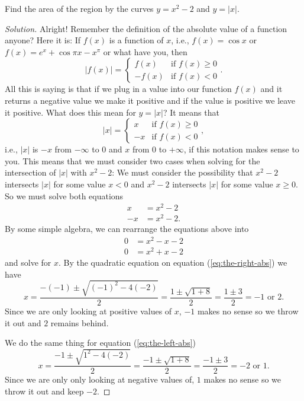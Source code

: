 \begin{problem}
Find the area of the region by the curves $y=x^2-2$ and $y=|x|$.
\end{problem}
\begin{proof}[Solution]
Alright! Remember the definition of the absolute value of a function
anyone? Here it is: If $f(x)$ is a function of $x$, i.e., $f(x)=\cos x$ or
$f(x)=e^x+\cos\pi x-x^{\pi}$ or what have you, then
\begin{equation}
  \label{eq:absolute-value}
\left|f(x)\right|=
\begin{cases}
f(x)&\text{if $f(x)\geq 0$}\\
-f(x)&\text{if $f(x)<0$}
\end{cases}.
\end{equation}
All this is saying is that if we plug in a value into our function $f(x)$
and it returns a negative value we make it positive and if the value is
positive we leave it positive. What does this mean for $y=|x|$? It means
that
\[
|x|=\begin{cases}
x&\text{if $f(x)\geq 0$}\\
-x&\text{if $f(x)<0$}
\end{cases},
\]
i.e., $|x|$ is $-x$ from $-\infty$ to $0$ and $x$ from $0$ to $+\infty$,
if this notation makes sense to you. This means that we must consider two
cases when solving for the intersection of $|x|$ with $x^2-2$: We must
consider the possibility that $x^2-2$ intersects $|x|$ for some value $x<0$
and $x^2-2$ intersects $|x|$ for some value $x\geq 0$. So we must solve
both equations
\begingroup
\allowdisplaybreaks
\begin{align*}
x&=x^2-2\\
-x&=x^2-2.
\end{align*}
\endgroup
By some simple algebra, we can rearrange the equations above into
\begingroup
\allowdisplaybreaks
\begin{align}
\label{eq:the-right-abs}
0&=x^2-x-2\\
\label{eq:the-left-abs}
0&=x^2+x-2
\end{align}
\endgroup
and solve for $x$. By the quadratic equation on equation
(\ref{eq:the-right-abs}) we have
\[
x=\frac{-(-1)\pm\sqrt{(-1)^2-4(-2)}}{2}=\frac{1\pm\sqrt{1+8}}{2}=\frac{1\pm
3}{2}=\text{$-1$ or $2$.}
\]
Since we are only looking at positive values of $x$, $-1$ makes no sense
so we throw it out and $2$ remains behind.

We do the same thing for equation (\ref{eq:the-left-abs})
\[
x=\frac{-1\pm\sqrt{1^2-4(-2)}}{2}=\frac{-1\pm\sqrt{1+8}}{2}=\frac{-1\pm
3}{2}=\text{$-2$ or $1$.}
\]
Since we are only only looking at negative values of, $1$ makes no sense so
we throw it out and keep $-2$.


\end{proof}

